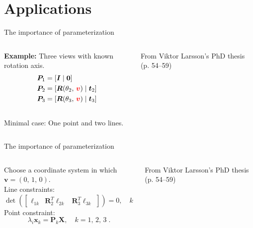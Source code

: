 \documentclass[aspectratio=169]{beamer}
\newcommand{\mat}[1]{\bm{#1}}
\newcommand{\T}{T}
\begin{document}
\section{Applications}
\begin{frame}[t]{The importance of parameterization}
\begin{columns}
    \begin{column}{0.5\textwidth}
        \begin{minipage}[t][\textheight][t]{\textwidth}
        \theimportanceOneHeight
        \textbf{Example:} Three views with known rotation axis.\\[8mm]
        \begin{equation*}
            \begin{aligned}
                \mat{P}_1 &= [\mat{I}\;|\;\mat{0}] \\
                \mat{P}_2 &= [\mat{R}(\theta_2,\,{\color{red}\mat{v}})\;|\;\mat{t}_2] \\
                \mat{P}_3 &= [\mat{R}(\theta_3,\,{\color{red}\mat{v}})\;|\;\mat{t}_3]
            \end{aligned}
        \end{equation*}\\[8mm]
        Minimal case: One point and two lines.
        \end{minipage}
    \end{column}%
    \begin{column}{0.5\textwidth}
        \centering
        
        {\footnotesize From Viktor Larsson's PhD thesis (p. 54--59)}
    \end{column}
\end{columns}
\end{frame}

\begin{frame}[t]{The importance of parameterization}
\begin{columns}
    \begin{column}{0.5\textwidth}
        \begin{minipage}[t][\textheight][t]{\textwidth}
        \theimportanceOneHeight
        Choose a coordinate system in which~$\mat{v}=(0,\,1,\,0)$.\\[5mm]
        Line constraints:
        \[
            \det\!\left(\begin{bmatrix}
                    \mat{\ell}_{1k} &
                    \mat{R}_2^\T\mat{\ell}_{2k} &
                    \mat{R}_3^\T\mat{\ell}_{3k}
                \end{bmatrix}\right) = 0,
        \quad k = 1,\,2\;.
        \]
        Point constraint:
        \[
            \lambda_i\mat{x}_k = \mat{P}_k\mat{X},  \quad k=1,\,2,\, 3\;.
        \]
        \end{minipage}
    \end{column}%
    \begin{column}{0.5\textwidth}
        \centering
        
        {\footnotesize From Viktor Larsson's PhD thesis (p. 54--59)}
    \end{column}
\end{columns}
\end{frame}
\end{document}
